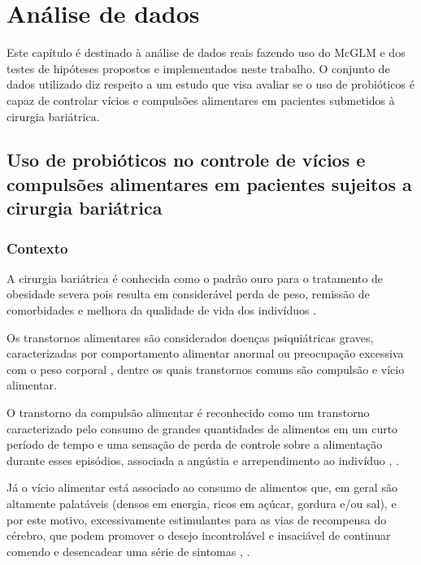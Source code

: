 

\chapter{Análise de dados}\label{cap:aplicacao}


Este capítulo é destinado à análise de dados reais fazendo uso do McGLM e dos testes de hipóteses propostos e implementados neste trabalho. O conjunto de dados utilizado diz respeito a um estudo que visa avaliar se o uso de probióticos é capaz de controlar vícios e compulsões alimentares em pacientes submetidos à cirurgia bariátrica.


\section{Uso de probióticos no controle de vícios e compulsões alimentares em pacientes sujeitos a cirurgia bariátrica}


\subsection{Contexto}

A cirurgia bariátrica é conhecida como o padrão ouro para o tratamento de obesidade severa pois resulta em considerável perda de peso, remissão de comorbidades e melhora da qualidade de vida dos indivíduos \citep{mechanick2020clinical}.

Os transtornos alimentares são considerados doenças psiquiátricas graves, caracterizadas por comportamento alimentar anormal ou preocupação excessiva com o peso corporal \citep{treasure2020eating}, dentre os quais transtornos comuns são compulsão e vício alimentar.

O transtorno da compulsão alimentar é reconhecido como um transtorno caracterizado pelo consumo de grandes quantidades de alimentos em um curto período de tempo e uma sensação de perda de controle sobre a alimentação durante esses episódios, associada a angústia e arrependimento ao indivíduo \citep{sarmiento2020diagnostic}, \citep{wilfley2016characteristics}.

Já o vício alimentar está associado ao consumo de alimentos que, em geral são altamente palatáveis (densos em energia, ricos em açúcar, gordura e/ou sal), e por este motivo, excessivamente estimulantes para as vias de recompensa do cérebro, que podem promover o desejo incontrolável e insaciável de continuar comendo e desencadear uma série de sintomas \citep{avena2012further}, \citep{najem2020prevalence}.

